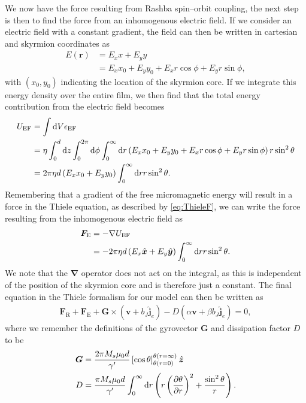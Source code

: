 We now have the force resulting from Rashba spin--orbit coupling, the next step is then to find the force from an inhomogenous electric field. If we consider an electric field with a constant gradient, the field can then be written in cartesian and skyrmion coordinates as
\begin{subequations}
\begin{align}
E(\mathbold{r}) &= E_x x + E_y y \\
&= E_x x_0 + E_y y_0 + E_x r \cos\phi + E_y r \sin\phi,
\end{align}
\end{subequations}
with $\left( x_0,y_0\right)$ indicating the location of the skyrmion core. If we integrate this energy density over the entire film, we then find that the total energy contribution from the electric field becomes
\begin{align}
\nonumber U_{\text{EF}} &= \int \operatorname{d}\!{V} \epsilon_{\text{EF}} \\
\nonumber &= \eta \int_0^d \operatorname{d}\!{z} \int_0^{2\pi}\operatorname{d}\!{\phi} \int_0^{\infty}\operatorname{d}\!{r}\left( E_x x_0 + E_y y_0 + E_x r \cos\phi + E_y r \sin\phi \right) r \sin^2\theta \\
&= 2\pi\eta d\left(E_x x_0 + E_y y_0\right)\int_0^{\infty}\operatorname{d}\!{r} r \sin^2\theta.
\end{align}
Remembering that a gradient of the free micromagnetic energy will result in a force in the Thiele equation, as described by \eqref{eq:ThieleF}, we can write the force resulting from the inhomogenous electric field as
\begin{align}
\nonumber\mathbold{F}_{\text{E}} &= -\mathbold{\nabla}U_{\text{EF}} \\
&= -2\pi \eta d \left(E_x \mathbold{\hat{x}} + E_y \mathbold{\hat{y}}\right) \int_0^{\infty}\d r r \sin^2\theta.
\end{align}
We note that the $\mathbold{\nabla}$ operator does not act on the integral, as this is independent of the position of the skyrmion core and is therefore just a constant. The final equation in the Thiele formalism for our model can then be written as
\begin{align}
\mathbold{F}_{\text{R}}+\mathbold{F}_{\text{E}} + \mathbold{G} \times\left(\mathbold{v}+b_J\mathbold{\hat{j}}_e\right) - D\left(\alpha\mathbold{v}+\beta b_J \mathbold{\hat{j}}_e\right) = 0,
\end{align}
where we remember the definitions of the gyrovector $\mathbold{G}$ and dissipation factor $D$ to be
\begin{subequations}
\begin{align}
\mathbold{G} &= \frac{2\pi M_s\mu_0 d}{\gamma'}\left[\cos\theta\right]_{\theta(r=0)}^{\theta(r=\infty)} \mathbold{\hat{z}}\\
D &= \frac{\pi M_s \mu_0 d}{\gamma '} \int_0^{\infty} \d r \left(r\left(\frac{\partial \theta}{\partial r}\right)^2+\frac{\sin^2\theta}{r}\right).
\end{align}
\end{subequations}
